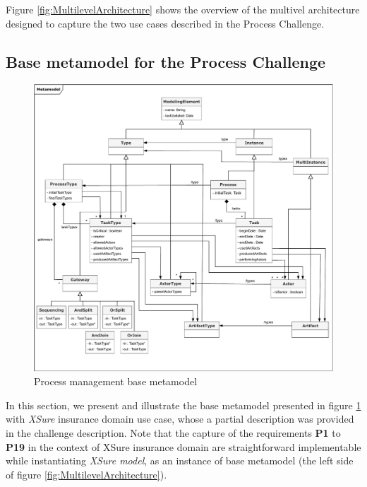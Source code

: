 
Figure \ref{fig:MultilevelArchitecture} shows the overview of the multivel architecture designed to capture the two use cases described in the Process Challenge.


\subsection{Base metamodel for the Process Challenge}

\begin{figure}
 \centering
    \includegraphics[width=1.0 \textwidth]{Figures/Metamodel.pdf}
     \caption{Process management base metamodel}
    \label{fig:BaseMetamodel}
\end{figure}

In this section, we present and illustrate the base metamodel presented in figure \ref{fig:BaseMetamodel} with \textit{XSure} insurance domain use case, whose a partial description was provided in the challenge description. Note that the capture of the requirements \textbf{P1} to \textbf{P19} in the context of XSure insurance domain are straightforward implementable while instantiating \textit{XSure model}, as an instance of base metamodel (the left side of figure \ref{fig:MultilevelArchitecture}).

